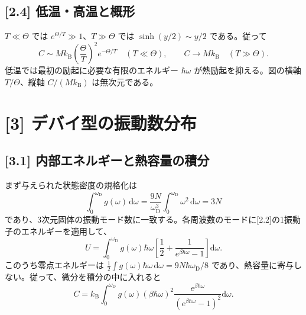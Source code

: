 \documentclass[11pt,a4paper]{article}
\begin{document}
\subsection*{[2.4] 低温・高温と概形}
$T\ll\Theta$ では $e^{\Theta/T}\gg1$、$T\gg\Theta$ では $\sinh(y/2)\sim y/2$ である。従って
\begin{equation}
\boxed{C\sim Mk_{\mathrm B}\left(\frac{\Theta}{T}\right)^2e^{-\Theta/T}
\quad(T\ll\Theta)},\qquad
\boxed{C\longrightarrow Mk_{\mathrm B}\quad(T\gg\Theta)}.
\end{equation}
低温では最初の励起に必要な有限のエネルギー $\hbar\omega$ が熱励起を抑える。図の横軸 $T/\Theta$、縦軸 $C/(Mk_{\mathrm B})$ は無次元である。
\begin{center}
\end{center}

\section*{[3] デバイ型の振動数分布}
\subsection*{[3.1] 内部エネルギーと熱容量の積分}
まず与えられた状態密度の規格化は
\begin{equation}
\int_0^{\omega_{\mathrm D}}g(\omega)\,\mathrm d\omega
=\frac{9N}{\omega_{\mathrm D}^3}
\int_0^{\omega_{\mathrm D}}\omega^2\,\mathrm d\omega=3N
\end{equation}
であり、3次元固体の振動モード数に一致する。各周波数のモードに[2.2]の1振動子のエネルギーを適用して、
\begin{equation}
\boxed{U=\int_0^{\omega_{\mathrm D}}\!g(\omega)\hbar\omega
\left[\frac12+\frac{1}{e^{\beta\hbar\omega}-1}\right]
\mathrm d\omega}.
\end{equation}
このうち零点エネルギーは $\frac12\int g(\omega)\hbar\omega\,\mathrm d\omega=9N\hbar\omega_{\mathrm D}/8$ であり、熱容量に寄与しない。従って、微分を積分の中に入れると
\begin{equation}
\boxed{C=k_{\mathrm B}\int_0^{\omega_{\mathrm D}}\!g(\omega)
(\beta\hbar\omega)^2
\frac{e^{\beta\hbar\omega}}{(e^{\beta\hbar\omega}-1)^2}
\mathrm d\omega}.
\end{equation}
\end{document}

